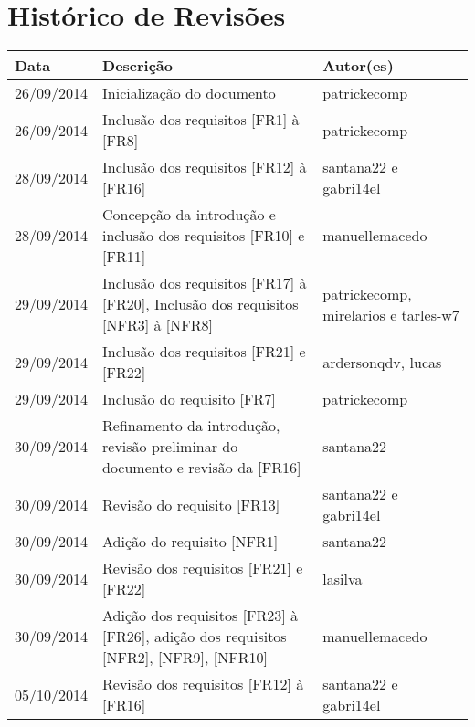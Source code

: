 \documentclass{article}
\begin{document}
\capa

\newpage
	
	\section*{\center Histórico de Revisões}
	  \vspace*{1cm}
	  \begin{table}[ht]
	    \centering
	    \begin{tabular}[pos]{|m{2cm} | m{7.2cm} | m{3.8cm}|} 
	      \hline
	      \cellcolor[gray]{0.9}
	      \textbf{Data} & \cellcolor[gray]{0.9}\textbf{Descrição} & \cellcolor[gray]{0.9}\textbf{Autor(es)}\\ \hline
	      \hline
	      \small 26/09/2014 & \small Inicialização do documento & \small patrickecomp \\ \hline      
	      \small 26/09/2014 & \small Inclusão dos requisitos [FR1] à [FR8] & \small patrickecomp \\ \hline 
	      \small 28/09/2014 & \small Inclusão dos requisitos [FR12] à [FR16] & \small santana22 e gabri14el \\ \hline
	      \small 28/09/2014 & \small Concepção da introdução e inclusão dos requisitos [FR10] e [FR11] & \small manuellemacedo \\ \hline 
	      \small 29/09/2014 & \small Inclusão dos requisitos [FR17] à [FR20], Inclusão dos requisitos [NFR3] à [NFR8] & \small patrickecomp, mirelarios e tarles-w7 \\ \hline    
	      \small 29/09/2014 & \small Inclusão dos requisitos [FR21] e [FR22] & \small ardersonqdv, lucas \\ \hline   
	      \small 29/09/2014 & \small Inclusão do requisito [FR7] & \small patrickecomp \\ \hline 
	      \small 30/09/2014 & \small Refinamento da introdução,  revisão preliminar do documento e revisão da [FR16] & \small santana22 \\ \hline
	      \small 30/09/2014 & \small Revisão do requisito [FR13] & \small santana22 e gabri14el \\ \hline
	      \small 30/09/2014 & \small Adição do requisito [NFR1] & \small santana22 \\ \hline
	      \small 30/09/2014 & \small Revisão dos requisitos [FR21] e [FR22] & \small lasilva\\ \hline
	      \small 30/09/2014 & \small Adição dos requisitos [FR23] à [FR26], adição dos requisitos [NFR2], [NFR9], [NFR10]  & \small manuellemacedo \\ \hline
	      \small 05/10/2014 & \small Revisão dos requisitos [FR12] à [FR16] & \small santana22 e gabri14el \\ \hline
	      
	    \end{tabular}
	  \end{table}
	
\end{document}
